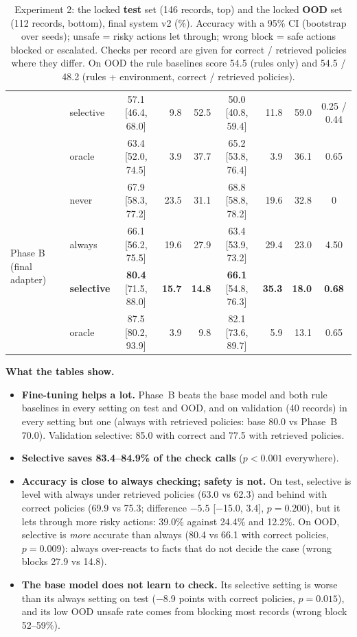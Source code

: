 \documentclass[10pt]{article}
\newcommand{\ci}[2]{[#1, #2]}
\begin{document}
\begin{table}[h]
\begin{tabular}{@{}llcrrcrrc@{}}
 & selective & 57.1 \ci{46.4}{68.0} & 9.8 & 52.5 & 50.0 \ci{40.8}{59.4} & 11.8 & 59.0 & 0.25 / 0.44\\
 & oracle & 63.4 \ci{52.0}{74.5} & 3.9 & 37.7 & 65.2 \ci{53.8}{76.4} & 3.9 & 36.1 & 0.65\\
\midrule
\multirow{4}{*}{Phase B (final adapter)} & never & 67.9 \ci{58.3}{77.2} & 23.5 & 31.1 & 68.8 \ci{58.8}{78.2} & 19.6 & 32.8 & 0\\
 & always & 66.1 \ci{56.2}{75.5} & 19.6 & 27.9 & 63.4 \ci{53.9}{73.2} & 29.4 & 23.0 & 4.50\\
 & \textbf{selective} & \textbf{80.4} \ci{71.5}{88.0} & \textbf{15.7} & \textbf{14.8} & \textbf{66.1} \ci{54.8}{76.3} & \textbf{35.3} & \textbf{18.0} & \textbf{0.68}\\
 & oracle & 87.5 \ci{80.2}{93.9} & 3.9 & 9.8 & 82.1 \ci{73.6}{89.7} & 5.9 & 13.1 & 0.65\\
\bottomrule
\end{tabular}
\caption{Experiment 2: the locked \textbf{test} set (146 records, top) and the locked \textbf{OOD} set (112
records, bottom), final system v2 (\%). Accuracy with a 95\% CI (bootstrap over seeds); unsafe = risky actions
let through; wrong block = safe actions blocked or escalated. Checks per record are given for correct /
retrieved policies where they differ. On OOD the rule baselines score 54.5 (rules only) and 54.5 / 48.2
(rules + environment, correct / retrieved policies).}
\label{tab:main-test}
\end{table}


\textbf{What the tables show.}
\begin{itemize}
\item \textbf{Fine-tuning helps a lot.} Phase~B beats the base model and both rule baselines in every setting
  on test and OOD, and on validation (40 records) in every setting but one (always with retrieved policies:
  base 80.0 vs Phase~B 70.0). Validation selective: 85.0 with correct and 77.5 with retrieved policies.
\item \textbf{Selective saves 83.4--84.9\% of the check calls} ($p<0.001$ everywhere).
\item \textbf{Accuracy is close to always checking; safety is not.} On test, selective is level with always
  under retrieved policies (63.0 vs 62.3) and behind with correct policies (69.9 vs 75.3; difference
  $-5.5$ \ci{$-$15.0}{3.4}, $p=0.200$), but it lets through more risky actions: 39.0\% against 24.4\% and
  12.2\%. On OOD, selective is \emph{more} accurate than always (80.4 vs 66.1 with correct policies,
  $p=0.009$): always over-reacts to facts that do not decide the case (wrong blocks 27.9 vs 14.8).
\item \textbf{The base model does not learn to check.} Its selective setting is worse than its always setting
  on test ($-$8.9 points with correct policies, $p=0.015$), and its low OOD unsafe rate comes from blocking
  most records (wrong block 52--59\%).
\end{itemize}
\end{document}
